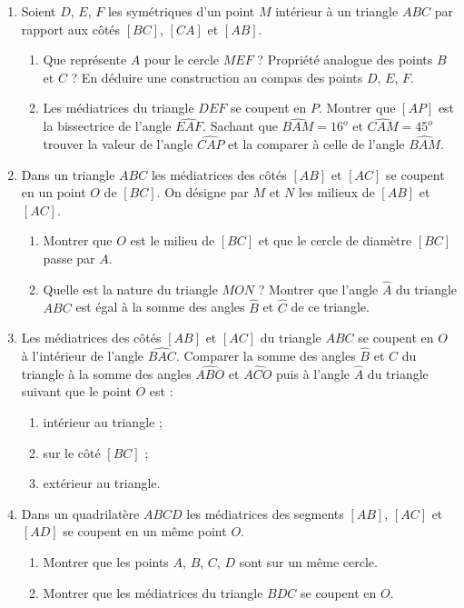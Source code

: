 \documentclass[12 pt]{report}
\theoremstyle{plain}
\newcounter{n}
\begin{document}
\begin{enumerate}
\begin{enumerate}
\end{enumerate}
\item Soient $D$, $E$, $F$ les symétriques d'un point $M$ intérieur à un triangle $ABC$ par rapport aux côtés $[BC]$, $[CA]$ et $[AB]$.\begin{enumerate}
\item Que représente $A$ pour le cercle $MEF$ ? Propriété analogue des points $B$
et $C$ ? En déduire une construction au compas des points $D$, $E$, $F$. 
\item Les médiatrices du triangle $DEF$ se coupent en $P$. Montrer que $[AP]$ est
la bissectrice de l'angle $\widehat{EAF}$. Sachant que $\widehat{BAM}=16^o$ et $\widehat{CAM}=45^o$ trouver la valeur de l'angle $\widehat{CAP}$ et la comparer à celle de l'angle $\widehat{BAM}$. 
\end{enumerate}
\item Dans un triangle $ABC$ les médiatrices des côtés $[AB]$ et $[AC]$ se coupent
en un point $O$ de $[BC]$. On désigne par $M$ et $N$ les milieux de $[AB]$ et $[AC]$.
\begin{enumerate}
\item Montrer que $O$ est le milieu de $[BC]$ et que le cercle de diamètre $[BC]$ passe par $A$. 
\item Quelle est la nature du triangle $MON$ ? Montrer que l'angle $\widehat{A}$ du 
triangle $ABC$ est égal à la somme des angles $\widehat{B}$ et $\widehat{C}$ de ce triangle.
\end{enumerate}
\item Les médiatrices des côtés $[AB]$ et $[AC]$ du triangle $ABC$ se coupent en $O$
à l'intérieur de l'angle $\widehat{BAC}$. Comparer la somme des angles $\widehat{B}$
et $\widehat{C}$ du triangle à la somme des angles $\widehat{ABO}$ et $\widehat{ACO}$
puis à l'angle $\widehat{A}$ du triangle suivant que le point $O$ est : \begin{enumerate}
\item intérieur au triangle ; \item sur le côté $[BC]$ ; \item extérieur au triangle.
\end{enumerate}
\item Dans un quadrilatère $ABCD$ les médiatrices des segments $[AB]$, $[AC]$ et 
$[AD]$ se coupent en un même point $O$. \begin{enumerate}
\item Montrer que les points $A$, $B$, $C$, $D$ sont sur un même cercle. 
\item Montrer que les médiatrices du triangle $BDC$ se coupent en $O$.

\end{enumerate}
\end{enumerate}
\end{document}
